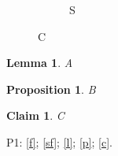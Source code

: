 \documentclass{article}
\newcommand\lemmaname{Lemma}
\newtheorem{lemma}{\lemmaname}
\newtheorem{prop}[theorem]{Proposition}
\newtheorem{claim}[theorem]{Claim}
\begin{document}
\begin{figure}\begin{subfigure}{.4\linewidth}\caption{S}\label{sf}\end{subfigure}\caption{C}\label{f}\end{figure}
\begin{lemma}\label{l}A\end{lemma}
\begin{prop}\label{p}B\end{prop}
\begin{claim}\label{c}C\end{claim}
P1: \autoref{f}; \autoref{sf}; \autoref{l}; \autoref{p}; \autoref{c}.
\end{document}
